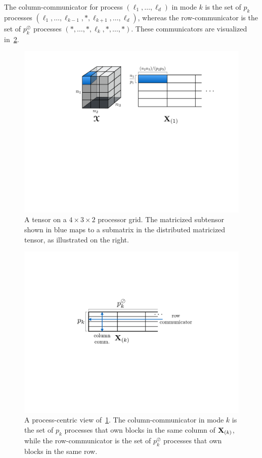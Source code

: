 The column-communicator for process $(\ell_1,\dots,\ell_d)$ in mode $k$ is the set of $p_k$ 
processes $(\ell_1,\dots,\ell_{k-1},*,\ell_{k+1},\dots,\ell_d)$, whereas the row-communicator is 
the set of $p_k^\oslash$ processes $(*,\dots,*,\ell_k,*,\dots,*)$. 
These communicators are visualized in~\cref{fig:tensor_comm}.
% 
\begin{figure}
  \centering 
  \includegraphics[width=0.6\linewidth]{figs/cartesian}
  \caption{A tensor on a $4\times3\times2$ processor grid. The matricized subtensor shown in blue maps to a submatrix in the distributed matricized tensor, as illustrated on the right. 
  }
  \label{fig:tensor_block_dist}
\end{figure}
\begin{figure}
  \centering 
  \includegraphics[width=0.55\linewidth]{figs/communicators}
  \caption{A process-centric view of~\cref{fig:tensor_block_dist}. The column-communicator in mode $k$ is the set of $p_k$ processes that own blocks in the same column of $\M{X}_{(k)}$, while the row-communicator is the set of $p_k^\oslash$ processes that own blocks in the same row.}
  \label{fig:tensor_comm}
\end{figure}


